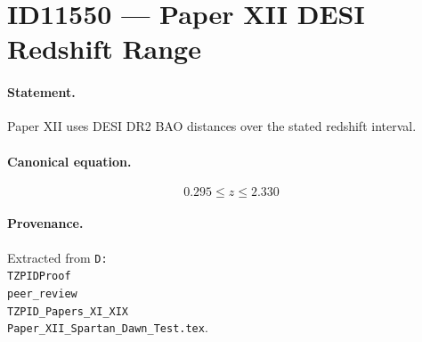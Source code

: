 \section*{ID11550 --- Paper XII DESI Redshift Range}

\paragraph{Statement.}
Paper XII uses DESI DR2 BAO distances over the stated redshift interval.

\paragraph{Canonical equation.}
\[
0.295\le z\le2.330
\]

\paragraph{Provenance.}
Extracted from \texttt{D:\\TZPIDProof\\peer\_review\\TZPID\_Papers\_XI\_XIX\\Paper\_XII\_Spartan\_Dawn\_Test.tex}.
